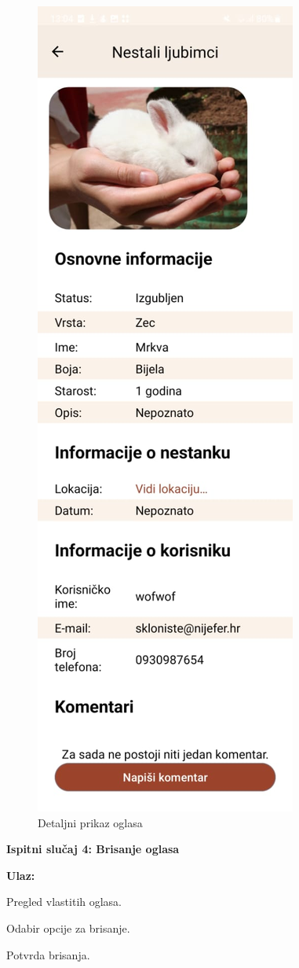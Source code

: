 \begin{figure}[H]
\begin{minipage}{.5\textwidth}
				  \includegraphics[width=.58\linewidth]{slike/app3v2.jpg}
				  \caption{Detaljni prikaz oglasa}
				  \label{fig:app3v2}
			\end{minipage}
			\end{figure}
			
			\noindent \textbf{Ispitni  slučaj 4: Brisanje oglasa}

			\noindent \textbf{Ulaz: }
			\begin{packed_enum}
				\item Pregled vlastitih oglasa.
				\item Odabir opcije za brisanje.
				\item Potvrda brisanja.
			\end{packed_enum}

